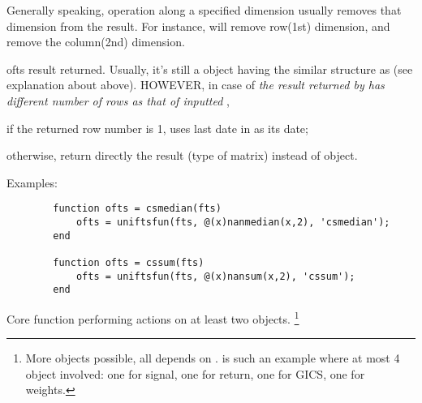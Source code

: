 \begin{argdesc}
                 Generally speaking, operation along a specified dimension
                 usually removes that dimension from the result. 
                 For instance,  will remove row(1st) dimension, 
                 and  remove the column(2nd) dimension.
          \item[ofts] result returned. 
                 Usually, it's still a \myfints{} object
                 having the similar structure as 
                 (see explanation about  above). 
                 HOWEVER, in case of 
                 \textit{the result returned by  has different number
                 of rows as that of inputted },
                    \begin{itemize*}
                    \item if the returned row number is 1, 
                           uses last date in  as its date; 
                    \item  otherwise, return directly the result (type of matrix)
                           instead of \myfints{} object.
                    \end{itemize*}
   \end{argdesc}

\noindent Examples:
  \begin{lstlisting}
        function ofts = csmedian(fts)
            ofts = uniftsfun(fts, @(x)nanmedian(x,2), 'csmedian');
        end
        
        function ofts = cssum(fts)
            ofts = uniftsfun(fts, @(x)nansum(x,2), 'cssum');
        end
  \end{lstlisting}

    Core function performing actions on at least two \myfints{} objects.
    \footnote{
    More \myfints{} objects possible, all depends on .
     is such an example where at most 4 \myfints{}
    object involved: one for signal, one for return, one for GICS, one for weights.}

